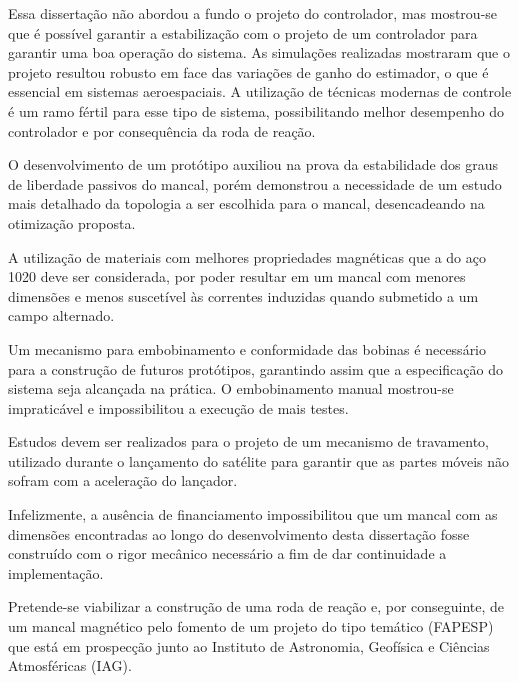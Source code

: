 Essa dissertação não abordou a fundo o projeto do controlador, mas mostrou-se que é possível garantir a estabilização com o projeto de um controlador para garantir uma boa operação do sistema. As simulações realizadas mostraram que o projeto resultou robusto em face das variações de ganho do estimador, o que é essencial em sistemas aeroespaciais. A utilização de técnicas modernas de controle é um ramo fértil para esse tipo de sistema, possibilitando melhor desempenho do controlador e por consequência da roda de reação. 

O desenvolvimento de um protótipo auxiliou na prova da estabilidade dos graus de liberdade passivos do mancal, porém demonstrou a necessidade de um estudo mais detalhado da topologia a ser escolhida para o mancal, desencadeando na otimização proposta.

A utilização de materiais com melhores propriedades magnéticas que a do aço 1020 deve ser considerada, por poder resultar em um mancal com menores dimensões e menos suscetível às correntes induzidas \citep{Ravaud2009} quando submetido a um campo alternado.

Um mecanismo para embobinamento e conformidade das bobinas é necessário para a construção de futuros protótipos, garantindo assim que a especificação do sistema seja alcançada na prática. O embobinamento manual mostrou-se impraticável e impossibilitou a execução de mais testes. 

Estudos devem ser realizados para o projeto de um mecanismo de travamento, utilizado durante o lançamento do satélite para garantir que as partes móveis não sofram com a aceleração do lançador.

Infelizmente, a ausência de financiamento impossibilitou que um mancal com as dimensões encontradas ao longo do desenvolvimento desta dissertação fosse construído com o rigor mecânico necessário a fim de dar continuidade a implementação. 

Pretende-se viabilizar a construção de uma roda de reação e, por conseguinte, de um mancal magnético pelo fomento de um projeto do tipo temático (FAPESP) que está em prospecção junto ao Instituto de Astronomia, Geofísica e Ciências Atmosféricas (IAG).




